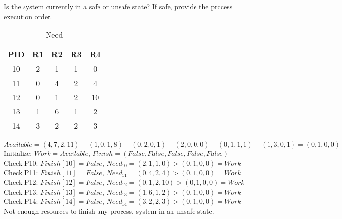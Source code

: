 \documentclass{article}
\begin{document}
Is the system currently in a safe or unsafe state?  If safe, provide the process execution order.

\begin{table}[H]
    \centering
  \caption{Need}
  \begin{tabular}{c|cccc}
    \toprule
    PID & R1 & R2 & R3 & R4\\
    \midrule
    10      & 2 & 1 & 1 & 0 \\
    11      & 0 & 4 & 2 & 4 \\
    12      & 0 & 1 & 2 & 10\\
    13      & 1 & 6 & 1 & 2 \\
    14      & 3 & 2 & 2 & 3 \\
    \bottomrule
  \end{tabular}
  \label{tbl:4_3}
\end{table}

$Available = (4,7,2,11)-(1,0,1,8)-(0,2,0,1)-(2,0,0,0)-(0,1,1,1)-(1,3,0,1)=(0,1,0,0)$\\
Initialize: $Work = Available$, $Finish = (False, False, False, False, False)$\\
Check P10: $Finish[10] = False$, $Need_{10} = (2,1,1,0) > (0,1,0,0) = Work$\\
Check P11: $Finish[11] = False$, $Need_{11} = (0,4,2,4) > (0,1,0,0) = Work$\\
Check P12: $Finish[12] = False$, $Need_{12} = (0,1,2,10) > (0,1,0,0) = Work$\\
Check P13: $Finish[13] = False$, $Need_{13} = (1,6,1,2) > (0,1,0,0) = Work$\\
Check P14: $Finish[14] = False$, $Need_{14} = (3,2,2,3) > (0,1,0,0) = Work$\\
Not enough resources to finish any process, system in an unsafe state.
\end{document}
